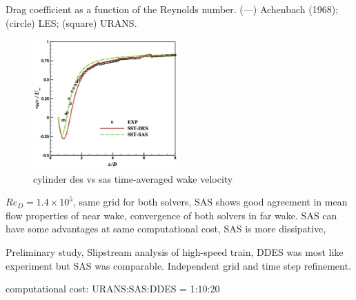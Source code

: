 \documentclass[journal]{new-aiaa}
\begin{document}
Drag coefficient as a function of the Reynolds number. (—) Achenbach (1968); (circle) LES; (square) URANS.




\begin{figure}[H]
\begin{center}
\includegraphics[width=0.49\textwidth]{Images/logan/zheng2016comparative_WakeVelocity.pdf}
\caption{ cylinder des vs sas time-averaged wake velocity \cite{zheng2016comparative} }
\label{fig:cylinderdesvssas}
\end{center}
\end{figure}

$Re_D = 1.4 \times 10^5$, same grid for both solvers, SAS shows good agreement in mean flow properties of near wake, convergence of both solvers in far wake. SAS can have some advantages at same computational cost, SAS is more dissipative,



Preliminary study, Slipstream analysis of high-speed train, DDES was most like experiment but SAS was comparable. Independent grid and time step refinement.

computational cost:
URANS:SAS:DDES = 1:10:20
\cite{wang2017performance}
\end{document}
